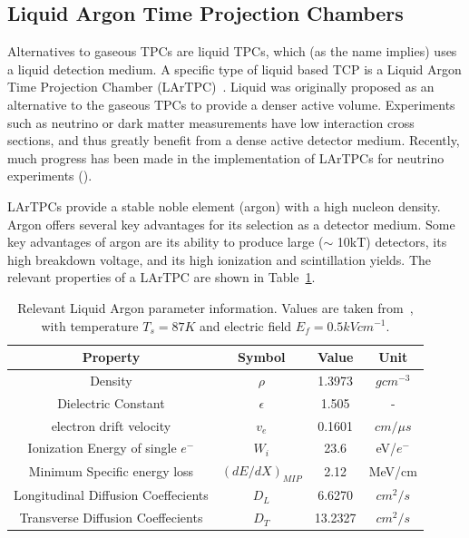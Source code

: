 \subsection{Liquid Argon Time Projection Chambers}
\label{sec:lartpcs}
Alternatives to gaseous TPCs are liquid TPCs, which (as the name implies) uses a liquid detection medium.
A specific type of liquid based TCP is a Liquid Argon Time Projection Chamber (LArTPC)~\citep{rubbia1977liquid}.
Liquid was originally proposed as an alternative to the gaseous TPCs to provide a denser active volume.
Experiments such as neutrino or dark matter measurements have low interaction cross sections, and thus greatly benefit from a dense active detector medium.
Recently, much progress has been made in the implementation of LArTPCs for neutrino experiments (\citep{ArgoNeuT_PhysRevD.99.012002, MicroBooNE_Acciarri_2017, LArIAT_Acciarri_2020}).

LArTPCs provide a stable noble element (argon) with a high nucleon density.
Argon offers several key advantages for its selection as a detector medium.
Some key advantages of argon are its ability to produce large ($\sim$ 10kT) detectors, its high breakdown voltage, and its high ionization and scintillation yields.
The relevant properties of a LArTPC are shown in Table~\ref{tab:lar_prop}.

\begin{table}
  \begin{center}
    \begin{tabular}{||c c c c||}
 \hline
      Property & Symbol & Value & Unit \\
 \hline\hline
      Density & $\rho$ &  1.3973 & $g cm^{-3}$ \\
      Dielectric Constant & $\epsilon$ & 1.505 & - \\
      electron drift velocity & $v_{e}$ & 0.1601 & $\unit{cm/\mu s}$ \\
      Ionization Energy of single $e^{-}$ & $W_{i}$ & 23.6 & eV/$e^{-}$ \\
      Minimum Specific energy loss & $(dE/dX)_{MIP}$ & 2.12 & MeV/cm \\
      Longitudinal Diffusion Coeffecients & $D_{L}$ & 6.6270 & $cm^{2}/s$ \\
      Transverse Diffusion Coeffecients & $D_{T}$ & 13.2327 & $cm^{2}/s$ \\
 \hline
    \end{tabular}
    \caption{
      Relevant Liquid Argon parameter information.
      Values are taken from~\citep{lardata_lbnl}, with temperature $T_{s} = 87 K$ and electric field $E_{f} = 0.5 kV cm^{-1}$.}
  \label{tab:lar_prop}
  \end{center}
\end{table}

